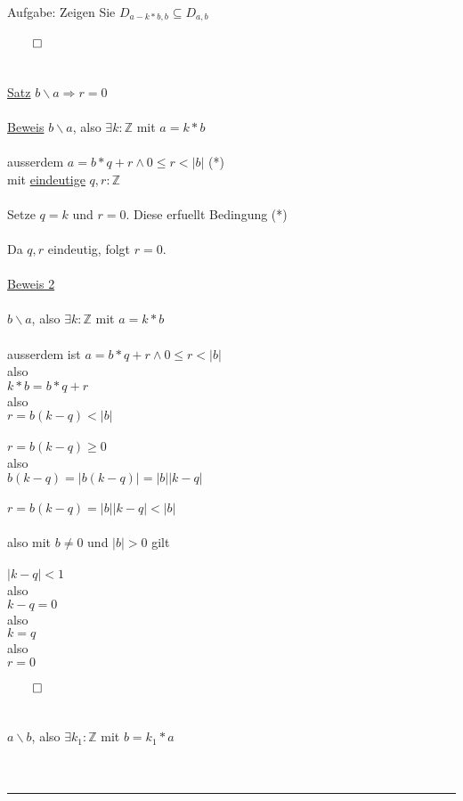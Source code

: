 \documentclass[18pt,a4paper]{article}
\newcommand{\tab}{\hspace*{2em}}
\begin{document}
\\
Aufgabe: Zeigen Sie $D_{a-k*b,b} \subseteq D_{a,b}$
\\
\\
$\qed$\\
\\
\\
\uline{Satz} $b\backslash a \Rightarrow r=0$\\
\\
\uline{Beweis} $b\backslash a$, also $\exists{k} : \mathbb{Z}$ mit $a=k*b$\\
\\
ausserdem $a=b*q+r \wedge 0 \leqslant r < |b|$ (*)\\
mit \uline{eindeutige} $q,r : \mathbb{Z}$\\
\\
Setze $q=k$ und $r=0$. Diese erfuellt Bedingung (*)\\
\\
Da $q,r$ eindeutig, folgt $r=0$.\\
\\
\uline{Beweis 2}\\
\\
$b \backslash a$, also $\exists{k}:\mathbb{Z}$ mit $ a = k*b$\\
\\
ausserdem ist $a = b*q+r \wedge 0 \leqslant r < |b|$\\
also\\
\tab $k*b = b*q+r$\\
also\\
\tab $r = b(k-q) < |b|$\\
\\
$r = b(k-q) \geqslant 0$\\
also\\
\tab $b(k-q) = |b(k-q)| = |b| |k-q|$\\
\\
$r = b(k-q) = |b| |k-q| < |b|$\\
\\
also mit $b \neq 0$ und $|b| > 0$ gilt\\
\\
\tab $|k-q| < 1$\\
also\\
\tab $k-q = 0$\\
also\\
\tab $k=q$\\
also\\
\tab $r=0$\\
\\
$\qed$\\
\\
\\
$a\backslash b$, also $\exists{k_1} : \mathbb{Z}$ mit $b = k_1 * a$\\
\\
\\
\rule{\textwidth}{0.4mm}\\
\\
\end{document}
